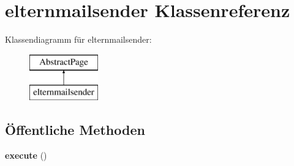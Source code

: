 \hypertarget{classelternmailsender}{}\section{elternmailsender Klassenreferenz}
\label{classelternmailsender}
Klassendiagramm für elternmailsender\+:\begin{figure}[H]
\begin{center}
\leavevmode
\includegraphics[height=2.000000cm]{classelternmailsender}
\end{center}
\end{figure}
\subsection*{Öffentliche Methoden}
\begin{DoxyCompactItemize}
\item 
\mbox{\label{classelternmailsender_aaa81d1df4c97140a9222ad91c8894bfb}} 
{\bfseries execute} ()
\end{DoxyCompactItemize}
